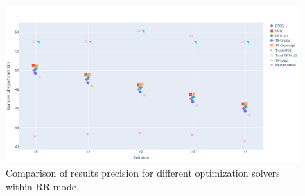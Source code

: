 \documentclass[11pt]{article}
\begin{document}
\begin{figure}
    \centering
    \includegraphics[width=\linewidth]{figure/unconstrained_optimization_comparison.pdf}
    \caption{Comparison of results precision for different optimization solvers within RR mode.}
    \label{fig:unconstrained_optimization}
\end{figure}
\end{document}
